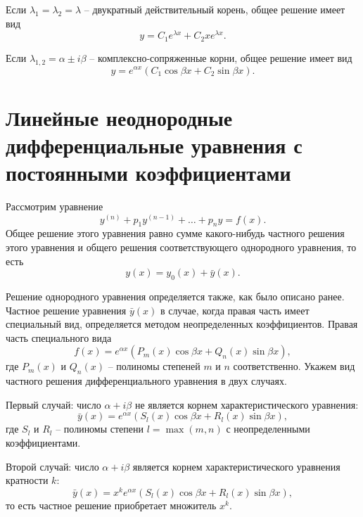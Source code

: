 \documentclass[a5paper, 11pt]{extbook}
\theoremstyle{definition}
\theoremstyle{definition}
\begin{document}
Если \(\lambda_1 = \lambda_2 = \lambda\) -- двукратный действительный корень, общее решение имеет вид
\[
    y = C_1 e^{\lambda x} + C_2 x e^{\lambda x}.
\]

Если \(\lambda_{1, 2} = \alpha \pm i \beta\) -- комплексно-сопряженные корни, общее решение имеет вид
\[
    y = e^{\alpha x} (C_1 \cos \beta x + C_2 \sin \beta x).
\]

\section{Линейные неоднородные дифференциальные уравнения с постоянными коэффициентами}

Рассмотрим уравнение
\[
    y^{(n)} + p_1 y^{(n - 1)} + \ldots + p_n y = f(x).
\]
Общее решение этого уравнения равно сумме какого-нибудь частного решения этого уравнения и общего решения соответствующего однородного уравнения, то есть
\[
    y(x) = y_0(x) + \bar{y}(x).
\]

Решение однородного уравнения определяется также, как было описано ранее. Частное решение уравнения \(\bar{y}(x)\) в случае, когда правая часть имеет специальный вид, определяется методом неопределенных коэффициентов. Правая часть специального вида
\[
    f(x) = e^{\alpha x} (P_m(x) \cos \beta x + Q_n(x) \sin \beta x),
\]
где \(P_m(x)\) и \(Q_n(x)\) -- полиномы степеней \(m\) и \(n\) соответственно. Укажем вид частного решения дифференциального уравнения в двух случаях.

Первый случай: число \(\alpha + i \beta\) не является корнем характеристического уравнения:
\[
    \bar{y}(x) = e^{\alpha x} (S_l(x) \cos \beta x + R_l(x) \sin \beta x),
\]
где \(S_l\) и \(R_l\) -- полиномы степени \(l = \max(m, n)\) с неопределенными коэффициентами.

Второй случай: число \(\alpha + i \beta\) является корнем характеристического уравнения кратности \(k\):
\[
    \bar{y}(x) = x^k e^{\alpha x} (S_l(x) \cos \beta x + R_l(x) \sin \beta x),
\]
то есть частное решение приобретает множитель \(x^k\).
\end{document}
